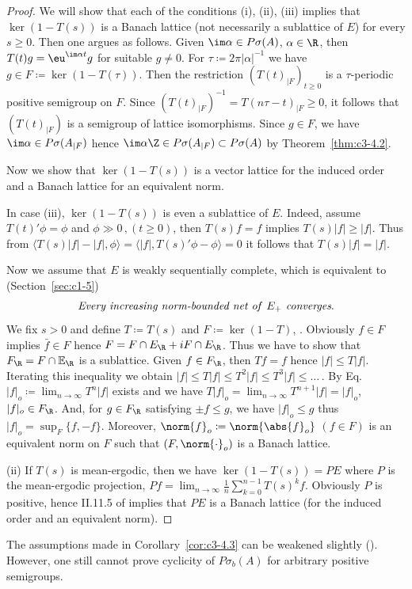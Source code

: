 \begin{proof}
	We will show that each of the conditions (i), (ii), (iii) implies that $\ker(1 - T(s))$ is a Banach lattice (not necessarily a sublattice of\/ $E$) for every $s \geq 0$. 
	Then one argues as follows. Given $\im\alpha \in P\sigma(A)$, $\alpha \in \R $, then $T(t)g = \eu^{\im\alpha t}g$ for suitable $g \neq 0$. 
	For $\tau \coloneqq  2\pi|\alpha|^{-1}$ we have $g \in F \coloneqq  \ker (1 - T(\tau))$. 
	Then the restriction $(T(t)_{|F})_{t \geq 0}$ is a $\tau$-periodic positive semigroup on $F$. 
	Since $\left(T(t)_{|F}\right)^{-1} = T(n\tau-t)_{|F} \geq 0$, it follows that $(T(t)_{|F})$ is a semigroup of lattice isomorphisms. 
	Since $g \in F$, we have $\im\alpha \in P\sigma(A_{|F})$ hence $\im\alpha\Z \in P\sigma(A_{|F}) \subset P\sigma(A)$ by Theorem~\ref{thm:c3-4.2}.
	
	Now we show that $\ker (1 - T(s))$ is a vector lattice for the induced order and a Banach lattice for an equivalent norm.
	
	In case (iii), $\ker (1 - T(s))$ is even a sublattice of\/ $E$. 
	Indeed, assume $T(t)'\phi = \phi$ and $\phi \gg 0\,, (t \geq 0)$, then $T(s)f = f$ implies $T(s)|f| \geq |f|$. 
	Thus from $\langle T(s)|f| - |f|,\phi\rangle = \langle |f|,T(s)'\phi - \phi \rangle = 0$ it follows that $T(s)|f| = |f|$.
	
	Now we assume that $E$ is weakly sequentially complete, which is equivalent to (\cf Section~\ref{sec:c1-5})
	\begin{equation}\label{eq:c3-4.5}
	\textit{Every increasing norm-bounded net of\/ $E_{+}$ converges}.
	\end{equation}
	We fix $s > 0$ and define $T \coloneqq  T(s)$ and $F \coloneqq  \ker (1 - T)$, . 
	Obviously $f \in F$ implies $\bar{f} \in F$ hence $F = F\cap E_{\R } + iF\cap E_{\R }$. 
	Thus we have to show that $F_{\R } = F\cap\mathbb{E}_{\R }$ is a sublattice. 
	Given $f \in F_{\R }$, then $Tf = f$ hence $|f| \leq T|f|$. 
	Iterating this inequality we obtain $|f| \leq T|f| \leq T^{2}|f| \leq T^{3}|f| \leq \dots\,.$ 
	By Eq.~ $|f|_{o} \coloneqq  \lim_{n\to \infty} T^{n}|f|$ exists and we have $T|f|_{o} = \lim_{n\to \infty} T^{n+1}|f| = |f|_{o}$, \ie $|f|_{o} \in F_{\R }$.
	And, for $g \in F_{\R }$ satisfying $\pm f \leq g$, we have $|f|_{o} \leq g$ thus $|f|_{o} = \sup_{F}\{f,-f\}$. 
Moreover, $\norm{f}_{o} \coloneqq \norm{\abs{f}_{o}}$ $(f \in F)$ is an equivalent norm on $F$ such that $(F,\norm{\cdot}_{o})$ is a Banach lattice.
	
	(ii) If\/ $T(s)$ is mean-ergodic, then we have $\ker (1 - T(s)) = PE$ where $P$ is the mean-ergodic projection, \ie $Pf = \lim_{n\to \infty}\frac{1}{n}\sum_{k=0}^{n-1}T(s)^{k}f$.
	Obviously $P$ is positive, hence II.11.5 of \textcite{schaefer:1974} implies that $PE$ is a Banach lattice (for the induced order and an equivalent norm).
\end{proof}
The assumptions made in Corollary~\ref{cor:c3-4.3} can be weakened slightly (\cf \textcite{greiner:1982}). 
However, one still cannot prove cyclicity of\/ $P\sigma_{b}(A)$ for arbitrary positive semigroups.

